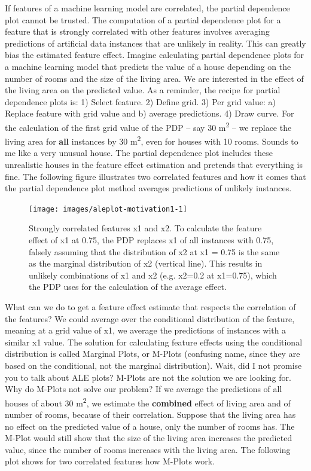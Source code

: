 \documentclass[
  12pt,
]{krantz}
\begin{document}
If features of a machine learning model are correlated, the partial dependence plot cannot be trusted.
The computation of a partial dependence plot for a feature that is strongly correlated with other features involves averaging predictions of artificial data instances that are unlikely in reality.
This can greatly bias the estimated feature effect.
Imagine calculating partial dependence plots for a machine learning model that predicts the value of a house depending on the number of rooms and the size of the living area.
We are interested in the effect of the living area on the predicted value.
As a reminder, the recipe for partial dependence plots is: 1) Select feature. 2) Define grid. 3) Per grid value: a) Replace feature with grid value and b) average predictions. 4) Draw curve.
For the calculation of the first grid value of the PDP -- say 30 m\textsuperscript{2} -- we replace the living area for \textbf{all} instances by 30 m\textsuperscript{2}, even for houses with 10 rooms.
Sounds to me like a very unusual house.
The partial dependence plot includes these unrealistic houses in the feature effect estimation and pretends that everything is fine.
The following figure illustrates two correlated features and how it comes that the partial dependence plot method averages predictions of unlikely instances.

\begin{figure}

{\centering \texttt{[image: images/aleplot-motivation1-1]} 

}

\caption{Strongly correlated features x1 and x2. To calculate the feature effect of x1 at 0.75, the PDP replaces x1 of all instances with 0.75, falsely assuming that the distribution of x2 at x1 = 0.75 is the same as the marginal distribution of x2 (vertical line). This results in unlikely combinations of x1 and x2 (e.g. x2=0.2 at x1=0.75), which the PDP uses for the calculation of the average effect.}\label{fig:aleplot-motivation1}
\end{figure}

What can we do to get a feature effect estimate that respects the correlation of the features?
We could average over the conditional distribution of the feature, meaning at a grid value of x1, we average the predictions of instances with a similar x1 value.
The solution for calculating feature effects using the conditional distribution is called Marginal Plots, or M-Plots (confusing name, since they are based on the conditional, not the marginal distribution).
Wait, did I not promise you to talk about ALE plots?
M-Plots are not the solution we are looking for.
Why do M-Plots not solve our problem?
If we average the predictions of all houses of about 30 m\textsuperscript{2}, we estimate the \textbf{combined} effect of living area and of number of rooms, because of their correlation.
Suppose that the living area has no effect on the predicted value of a house, only the number of rooms has.
The M-Plot would still show that the size of the living area increases the predicted value, since the number of rooms increases with the living area.
The following plot shows for two correlated features how M-Plots work.
\end{document}
